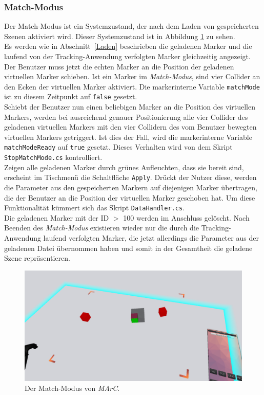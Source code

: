 \subsubsection{Match-Modus}\label{MatchModus}%
Der Match-Modus ist ein Systemzustand, der nach dem Laden von gespeicherten Szenen aktiviert wird. Dieser Systemzustand ist in Abbildung \ref{fig:Matchmodus} zu sehen.\\
Es werden wie in Abschnitt~\ref{Laden} beschrieben die geladenen Marker und die laufend von der Tracking-Anwendung verfolgten Marker gleichzeitig angezeigt. Der Benutzer muss jetzt die echten Marker an die Position der geladenen virtuellen Marker schieben. Ist ein Marker im \emph{Match-Modus}, sind vier Collider an den Ecken der virtuellen Marker aktiviert. Die markerinterne Variable \texttt{matchMode} ist zu diesem Zeitpunkt auf \texttt{false} gesetzt.\\
Schiebt der Benutzer nun einen beliebigen Marker an die Position des virtuellen Markers, werden bei ausreichend genauer Positionierung alle vier Collider des geladenen virtuellen Markers mit den vier Collidern des vom Benutzer bewegten virtuellen Markers getriggert. Ist dies der Fall, wird die markerinterne Variable \texttt{matchModeReady} auf \texttt{true} gesetzt. Dieses Verhalten wird von dem Skript \texttt{Stop\-Match\-Mode.cs} kontrolliert.\\
Zeigen alle geladenen Marker durch grünes Aufleuchten, dass sie bereit sind, erscheint im Tischmenü die Schaltfläche \texttt{Apply}. Drückt der Nutzer diese, werden die Parameter aus den gespeicherten Markern auf diejenigen Marker übertragen, die der Benutzer an die Position der virtuellen Marker geschoben hat. Um diese Funktionalität kümmert sich das Skript \texttt{DataHandler.cs}.\\
Die geladenen Marker mit der ID $>$ 100 werden im Anschluss gelöscht. Nach Beenden des \emph{Match-Modus} existieren wieder nur die durch die Tracking-Anwendung laufend verfolgten Marker, die jetzt allerdings die Parameter aus der geladenen Datei übernommen haben und somit in der Gesamtheit die geladene Szene repräsentieren.


\begin{figure}
	\centering
	\includegraphics[width=\textwidth]{Bilder/Matchmode}
	\caption[Match-Modus von \emph{MArC}]{Der Match-Modus von \emph{MArC}.}
	\label{fig:Matchmodus}
\end{figure}

